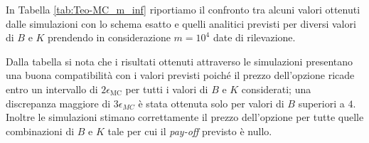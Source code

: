 In Tabella \ref{tab:Teo-MC_m_inf} riportiamo il confronto tra alcuni valori ottenuti dalle simulazioni con lo schema esatto e quelli analitici previsti per diversi valori di $B$ e $K$ prendendo in considerazione $m=10^4$ date di rilevazione.

Dalla tabella si nota che i risultati ottenuti attraverso le simulazioni presentano una buona compatibilità con i valori previsti poiché il prezzo dell'opzione ricade entro un intervallo di $2\epsilon_\text{MC}$ per tutti i valori di $B$ e $K$ considerati; una discrepanza maggiore di $3\epsilon_{MC}$ è stata ottenuta solo per valori di $B$ superiori a $4$. Inoltre le simulazioni stimano correttamente il prezzo dell'opzione per tutte quelle combinazioni di $B$ e $K$ tale per cui il \textit{pay-off} previsto è nullo.